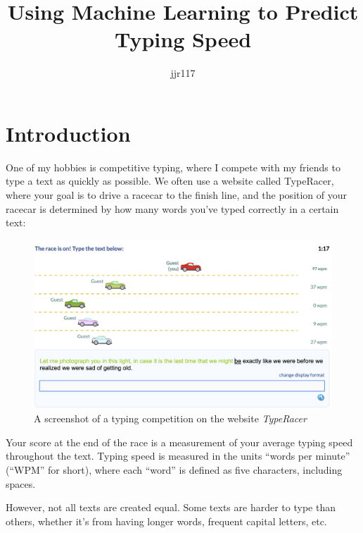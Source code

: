 \documentclass[12pt]{article}
\title{Using Machine Learning to Predict Typing Speed}
\author{jjr117}
\date{}
\begin{document}
\maketitle

\section*{Introduction}

One of my hobbies is competitive typing, where I compete with my friends to type a text as quickly as possible. We often use a website called TypeRacer, where your goal is to drive a racecar to the finish line, and the position of your racecar is determined by how many words you've typed correctly in a certain text:

\begin{figure}[H]
	\includegraphics[width=\textwidth]{typeracer.png}
	\caption{A screenshot of a typing competition on the website \textit{TypeRacer}}
\end{figure}

Your score at the end of the race is a measurement of your average typing speed throughout the text. Typing speed is measured in the units ``words per minute'' (``WPM'' for short), where each ``word'' is defined as five characters, including spaces.

However, not all texts are created equal. Some texts are harder to type than others, whether it's from having longer words, frequent capital letters, etc.
\end{document}
